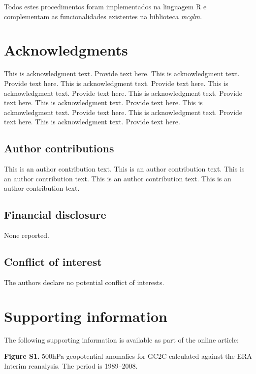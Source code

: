 \documentclass[AMA,STIX1COL]{WileyNJD-v2}
\begin{document}
Todos estes procedimentos foram implementados na linguagem R e complementam as funcionalidades existentes na biblioteca \emph{mcglm}.



\section*{Acknowledgments}
This is acknowledgment text.\cite{Kenamond2013} Provide text here. This is acknowledgment text. Provide text here. This is acknowledgment text. Provide text here. This is acknowledgment text. Provide text here. This is acknowledgment text. Provide text here. This is acknowledgment text. Provide text here. This is acknowledgment text. Provide text here. This is acknowledgment text. Provide text here. This is acknowledgment text. Provide text here. 


\subsection*{Author contributions}

This is an author contribution text. This is an author contribution text. This is an author contribution text. This is an author contribution text. This is an author contribution text. 

\subsection*{Financial disclosure}

None reported.

\subsection*{Conflict of interest}

The authors declare no potential conflict of interests.

\section*{Supporting information}

The following supporting information is available as part of the online article:

\noindent
\textbf{Figure S1.}
{500{\uns}hPa geopotential anomalies for GC2C calculated against the ERA Interim reanalysis. The period is 1989--2008.}
\end{document}
